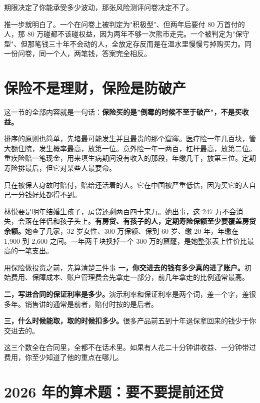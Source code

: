 \begin{pullquote}{}
期限决定了你能承受多少波动，那张风险测评问卷决定不了。
\end{pullquote}

推一步就明白了。一个在问卷上被判定为"积极型"、但两年后要付 80 万首付的人，那 80 万碰都不该碰权益，因为两年不够一次熊市走完。一个被判定为"保守型"、但那笔钱三十年不会动的人，全放定存反而是在温水里慢慢亏掉购买力。同一份问卷，同一个人，两笔钱，答案完全相反。

\section{保险不是理财，保险是防破产}

这一节的全部内容就是一句话：\textbf{保险买的是"倒霉的时候不至于破产"，不是买收益。}

排序的原则也简单，先堵最可能发生并且最贵的那个窟窿。医疗险一年几百块，管大额住院，发生概率最高，放第一位。意外险一年一两百，杠杆最高，放第二位。重疾险赔一笔现金，用来填生病期间没有收入的那段，年缴几千，放第三位。定期寿险排最后，但它对某些人最要命。

只在被保人身故时赔付，赔给还活着的人。它在中国被严重低估，因为买它的人自己一分钱好处都得不到。

林悦要是明年结婚生孩子，房贷还剩两百四十来万。她出事，这 247 万不会消失，会落在伴侣和孩子头上。\textbf{有房贷、有孩子的人，定期寿险保额至少要覆盖房贷余额。}她查了几家，32 岁女性、300 万保额、保到 60 岁、缴 20 年，年缴在 1,900 到 2,600 之间。一年两千块换掉一个 300 万的窟窿，是她整张表上性价比最高的一笔支出。

\begin{warnbox}{用保险做投资之前，先算清楚三件事}
\textbf{一，你交进去的钱有多少真的进了账户。}初始费用、保障成本、账户管理费会先拿走一部分，前几年拿走的比例通常最高。

\textbf{二，写进合同的保证利率是多少。}演示利率和保证利率是两个词，差一个字，差很多年。销售讲的通常是前者，赔付时按的是后者。

\textbf{三，什么时候能取，取的时候扣多少。}很多产品前五到十年退保拿回来的钱少于你交进去的。

这三个数全在合同里，全都不在话术里。如果有人花二十分钟讲收益、一分钟带过费用，你至少知道了他的重点在哪儿。

\end{warnbox}

\section{2026 年的算术题：要不要提前还贷}


